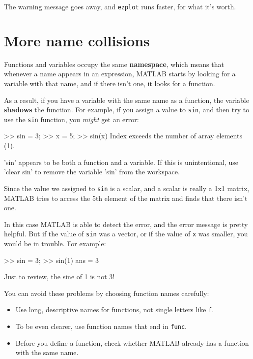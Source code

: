 \documentclass[
]{book}
\numberwithin{Answer}{chapter}
\numberwithin{Exercise}{chapter}
\begin{document}
The warning message goes away, and {\tt ezplot} runs faster, for what it's worth.



\section{More name collisions}

Functions and variables occupy the same {\bf namespace}, which means
that whenever a name appears in an expression, MATLAB starts by looking
for a variable with that name, and if there isn't one, it looks for
a function.

As a result, if you have a variable with the same name as a function,
the variable {\bf shadows} the function.  For example, if you assign
a value to {\tt sin}, and then try to use the {\tt sin} function, you
{\em might} get an error:

\begin{code}
>> sin = 3;
>> x = 5;
>> sin(x)
Index exceeds the number of array elements (1).

'sin' appears to be both a function and a variable.
If this is unintentional, use 'clear sin' to remove 
the variable 'sin' from the workspace.
\end{code}

Since the value we assigned to {\tt sin}
is a scalar, and a scalar is really a 1x1 matrix, MATLAB tries to
access the 5th element of the matrix and finds that there isn't one.

In this case MATLAB is able to detect the error, and the error message is pretty helpful.
But if the value of {\tt sin} was a vector, or if the value of {\tt x} was smaller, you would be in trouble.  For example:

\begin{code}
>> sin = 3;
>> sin(1)
ans = 3
\end{code}

Just to review, the sine of 1 is not 3!

You can avoid these problems by choosing function names carefully:

\begin{itemize}

\item Use long, descriptive names for functions, not single letters like {\tt f}.

\item To be even clearer, use function names that end in {\tt func}.

\item Before you define a function, check whether MATLAB already has a function with the same name.

\end{itemize}
\end{document}
